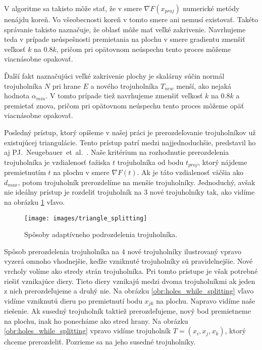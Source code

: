 V algoritme sa takisto môže stať, že v smere $\nabla F(x_{proj})$ numerické metódy nenájdu koreň. 
Vo všeobecnosti koreň v tomto smere ani nemusí existovať. Takéto správanie takisto naznačuje, že oblasť
môže mať veľké zakrivenie. Navrhujeme teda v prípade neúspešnosti premietania na plochu v smere gradientu 
zmenšiť veľkosť $k$ na $0.8 k$, pričom pri opätovnom neúspechu tento proces môžeme viacnásobne opakovať.

Ďalší fakt naznačujúci veľké zakrivenie plochy je skalárny súčin normál trojuholníka $N$ pri hrane $E$
a nového trojuholníka $T_{new}$ menší, ako nejaká hodnota $\alpha_{min}$. V tomto prípade tiež navrhujeme
zmenšiť veľkosť $k$ na $0.8 k$ a premietať znova, pričom pri opätovnom neúspechu tento proces 
môžeme opäť viacnásobne opakovať.

Posledný prístup, ktorý opíšeme v našej práci je prerozdeľovanie 
trojuholníkov už existujúcej triangulácie. Tento prístup patrí medzi najjednoduchšie, predstavil 
ho aj PJ.~Neugebauer~et~al.~\cite{neugebauer1997adaptive}. 
Naše kritérium na rozhodnutie prerozdelenia trojuholníka
je vzdialenosť ťažiska $t$ trojuholníka od bodu $t_{proj}$, ktorý nájdeme premietnutím $t$ na plochu
v smere $\nabla F(t)$. Ak je táto vzdialenosť väčšia ako $d_{max}$, potom trojuholník prerozdelíme 
na menšie trojuholníky. Jednoduchý, avšak nie ideálny prístup je rozdeliť trojuholník na 3 nové 
trojuholníky tak, ako vidíme na obrázku \ref{obr:triangle_splitting} vľavo. 

\begin{figure}
    \centerline{\texttt{[image: images/triangle\_splitting]}}
    \caption[Spôsoby adaptívneho podrozdelenia trojuholníka]
    {Spôsoby adaptívneho podrozdelenia trojuholníka.}
    \label{obr:triangle_splitting}
\end{figure}

Spôsob prerozdelenia 
trojuholníka na 4 nové trojuholníky ilustrovaný vpravo vyzerá omnoho vhodnejšie, keďže vzniknuté 
trojuholníky sú pravidelnejšie. Nové vrcholy
volíme ako stredy strán trojuholníka. Pri tomto prístupe je však potrebné riešiť vznikajúce diery.
Tieto diery vznikajú medzi dvoma trojuholníkmi ak jeden z nich prerozdeľujeme
a druhý nie. Na obrázku \ref{obr:holes_while_splitting} vľavo vidíme vzniknutú dieru po premietnutí bodu
$x_{jk}$ na plochu. Napravo vidíme naše riešenie. Ak susedný trojuholník taktiež prerozdeľujeme, nový bod
premietneme na plochu, inak ho ponecháme ako stred hrany. Na obrázku \ref{obr:holes_while_splitting} vpravo
vidíme trojuholník $T=(x_i, x_j, x_k)$, ktorý chceme prerozdeliť. Pozrieme sa na jeho susedné trojuholníky.

